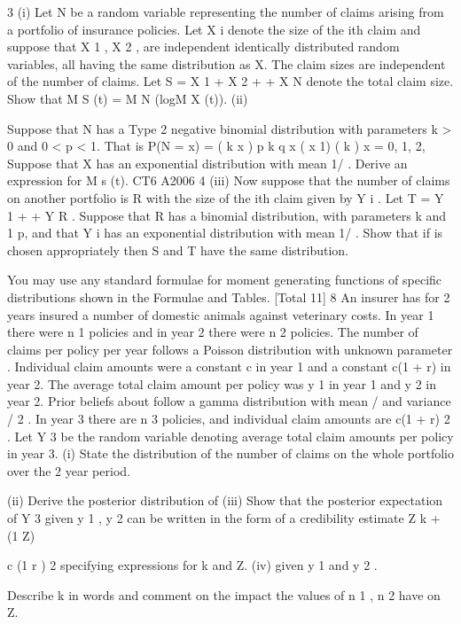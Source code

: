 \documentclass[a4paper,12pt]{article}
\begin{document}
3
(i) Let N be a random variable representing the number of claims arising from a
portfolio of insurance policies. Let X i denote the size of the ith claim and suppose that X 1 , X 2 , are independent identically distributed random variables, all having the same distribution as X. The claim sizes are
independent of the number of claims. Let S = X 1 + X 2 +
+ X N denote the
total claim size. Show that
M S (t) = M N (logM X (t)).
(ii)

Suppose that N has a Type 2 negative binomial distribution with parameters
k > 0 and 0 < p < 1. That is
P(N = x) =
( k x )
p k q x
( x 1) ( k )
x = 0, 1, 2,
Suppose that X has an exponential distribution with mean 1/ . Derive an
expression for M s (t).
CT6 A2006 4
(iii)
Now suppose that the number of claims on another portfolio is R with the size
of the ith claim given by Y i . Let T = Y 1 +
+ Y R . Suppose that R has a
binomial distribution, with parameters k and 1 p, and that Y i has an exponential distribution with mean 1/ . Show that if is chosen appropriately then S and T have the same distribution.

You may use any standard formulae for moment generating functions of specific distributions shown in the Formulae and Tables.
[Total 11]
8
An insurer has for 2 years insured a number of domestic animals against veterinary costs. In year 1 there were n 1 policies and in year 2 there were n 2 policies. The number of claims per policy per year follows a Poisson distribution with unknown parameter .
Individual claim amounts were a constant c in year 1 and a constant c(1 + r) in year 2.
The average total claim amount per policy was y 1 in year 1 and y 2 in year 2. Prior beliefs about follow a gamma distribution with mean / and variance / 2 . In
year 3 there are n 3 policies, and individual claim amounts are c(1 + r) 2 . Let Y 3 be the random variable denoting average total claim amounts per policy in year 3.
(i) State the distribution of the number of claims on the whole portfolio over the 2 year period.

(ii) Derive the posterior distribution of
(iii) Show that the posterior expectation of Y 3 given y 1 , y 2 can be written in the form of a credibility estimate
Z
k + (1
Z)

c (1 r ) 2
specifying expressions for k and Z.
(iv)
given y 1 and y 2 .

Describe k in words and comment on the impact the values of n 1 , n 2 have
on Z.
\end{document}
